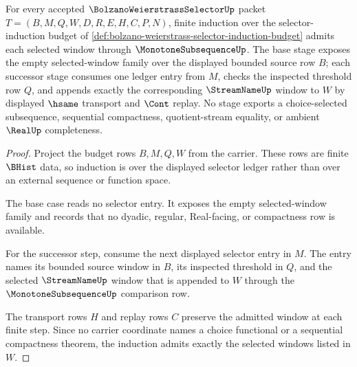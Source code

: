 \begin{theorem}
\label{thm:bolzano-weierstrass-selector-finite-monotone-induction}
For every accepted $\BolzanoWeierstrassSelectorUp$ packet
$T=(B,M,Q,W,D,R,E,H,C,P,N)$, finite induction over the selector-induction budget
of \autoref{def:bolzano-weierstrass-selector-induction-budget} admits each
selected window through $\MonotoneSubsequenceUp$. The base stage exposes the
empty selected-window family over the displayed bounded source row $B$; each
successor stage consumes one ledger entry from $M$, checks the inspected
threshold row $Q$, and appends exactly the corresponding $\StreamNameUp$ window
to $W$ by displayed $\hsame$ transport and $\Cont$ replay. No stage exports a
choice-selected subsequence, sequential compactness, quotient-stream equality,
or ambient $\RealUp$ completeness.
\end{theorem}
\begin{proof}
Project the budget rows $B,M,Q,W$ from the carrier. These rows are finite
$\BHist$ data, so induction is over the displayed selector ledger rather than
over an external sequence or function space.

The base case reads no selector entry. It exposes the empty selected-window
family and records that no dyadic, regular, Real-facing, or compactness row is
available.

For the successor step, consume the next displayed selector entry in $M$. The
entry names its bounded source window in $B$, its inspected threshold in $Q$,
and the selected $\StreamNameUp$ window that is appended to $W$ through the
$\MonotoneSubsequenceUp$ comparison row.

The transport rows $H$ and replay rows $C$ preserve the admitted window at each
finite step. Since no carrier coordinate names a choice functional or a
sequential compactness theorem, the induction admits exactly the selected
windows listed in $W$.
\end{proof}

